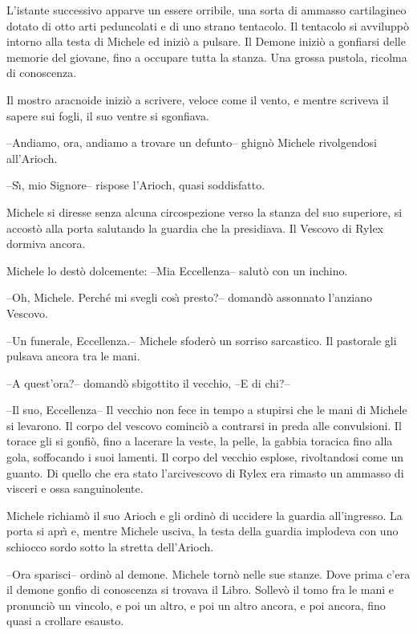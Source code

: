 \begin{racconto}
  L'istante successivo apparve un essere orribile, una sorta di
  ammasso cartilagineo dotato di otto arti peduncolati e di uno strano
  tentacolo. Il tentacolo si avvilupp\`o intorno alla testa di
  Michele ed inizi\`o a pulsare. Il Demone inizi\`o a gonfiarsi
  delle memorie del giovane, fino a occupare tutta la stanza. Una
  grossa pustola, ricolma di conoscenza.
  
  Il mostro aracnoide inizi\`o a scrivere, veloce come il vento, e
  mentre scriveva il sapere sui fogli, il suo ventre si sgonfiava.
  
  --Andiamo, ora, andiamo a trovare un defunto-- ghign\`o Michele
  rivolgendosi all'Arioch.
  
  --S\`\i, mio Signore-- rispose l'Arioch, quasi soddisfatto.
  
  Michele si diresse senza alcuna circospezione verso la stanza del
  suo superiore, si accost\`o alla porta salutando la guardia che la
  presidiava.  Il Vescovo di Rylex dormiva ancora.
  
  Michele lo dest\`o dolcemente: --Mia Eccellenza-- salut\`o con un
  inchino.
  
  --Oh, Michele. Perch\'e mi svegli cos\`{\i} presto?-- domand\`o
  assonnato l'anziano Vescovo.
  
  --Un funerale, Eccellenza.-- Michele sfoder\`o un sorriso
  sarcastico.  Il pastorale gli pulsava ancora tra le mani.
  
  --A quest'ora?-- domand\`o sbigottito il vecchio, --E di chi?--
  
  --Il suo, Eccellenza-- Il vecchio non fece in tempo a stupirsi che le
  mani di Michele si levarono. Il corpo del vescovo cominci\`o a
  contrarsi in preda alle convulsioni. Il torace gli si gonfi\`o,
  fino a lacerare la veste, la pelle, la gabbia toracica fino alla
  gola, soffocando i suoi lamenti. Il corpo del vecchio esplose,
  rivoltandosi come un guanto. Di quello che era stato l'arcivescovo
  di Rylex era rimasto un ammasso di visceri e ossa sanguinolente.
  
  Michele richiam\`o il suo Arioch e gli ordin\`o di uccidere la
  guardia all'ingresso. La porta si apr\`{\i} e, mentre Michele usciva,
  la testa della guardia implodeva con uno schiocco sordo sotto la
  stretta dell'Arioch.
  
  --Ora sparisci-- ordin\`o al demone. Michele torn\`o nelle sue
  stanze.  Dove prima c'era il demone gonfio di conoscenza si trovava
  il Libro. Sollev\`o il tomo fra le mani e pronunci\`o un
  vincolo, e poi un altro, e poi un altro ancora, e poi ancora, fino
  quasi a crollare esausto.
  

\end{racconto}

